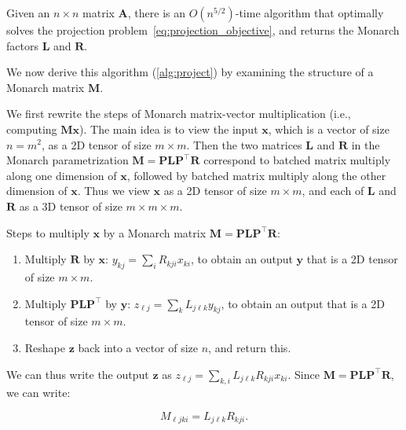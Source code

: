 \begin{theorem}\label{thm:Monarch_projection}
  Given an $n \times n$ matrix $\mathbf{A}$, there is an $O(n^{5/2})$-time algorithm that optimally solves the projection problem~\eqref{eq:projection_objective},
  and returns the Monarch factors $\mathbf{L}$ and $\mathbf{R}$.
\end{theorem}

We now derive this algorithm (\ref{alg:project}) by examining the structure of a Monarch matrix $\mathbf{M}$.

We first rewrite the steps of Monarch matrix-vector multiplication (i.e., computing $\mathbf{M} \mathbf{x}$).
The main idea is to view the input $\mathbf{x}$, which is a vector of size $n = m^2$, as a 2D tensor of size $m \times m$. Then the two matrices $\mathbf{L}$ and $\mathbf{R}$ in the Monarch parametrization $\mathbf{M} = \mathbf{P}\mathbf{L}\mathbf{P}^\top \mathbf{R}$ correspond to batched matrix multiply along one dimension of $\mathbf{x}$, followed by batched matrix multiply along the other dimension of $\mathbf{x}$.
Thus we view $\mathbf{x}$ as a 2D tensor of size $m \times m$, and each of
$\mathbf{L}$ and $\mathbf{R}$ as a 3D tensor of size $m \times m \times m$.

Steps to multiply $\mathbf{x}$ by a Monarch matrix $\mathbf{M} = \mathbf{P} \mathbf{L} \mathbf{P}^\top \mathbf{R}$:

\begin{enumerate}[leftmargin=*,nosep,nolistsep,noitemsep]
  \item Multiply $\mathbf{R}$ by $\mathbf{x}$: $y_{kj} = \sum_i R_{kji} x_{ki}$, to obtain an output $\mathbf{y}$ that is a 2D tensor of size $m \times m$.
  \item Multiply $\mathbf{P} \mathbf{L} \mathbf{P}^\top$ by $\mathbf{y}$: $z_{\ell j} = \sum_k L_{j\ell k} y_{kj}$, to obtain an output that is a 2D tensor of size $m \times m$.
  \item Reshape $\mathbf{z}$ back into a vector of size $n$, and return this.
\end{enumerate}

We can thus write the output $\mathbf{z}$ as $z_{\ell j} = \sum_{k, i} L_{j\ell k} R_{kji} x_{ki}$. Since $\mathbf{M} = \mathbf{P} \mathbf{L} \mathbf{P}^\top\mathbf{R}$, we can write:

\begin{equation}
  \label{eq:b_einsum}
  M_{\ell jki} = L_{j\ell k} R_{kji}.
\end{equation}

